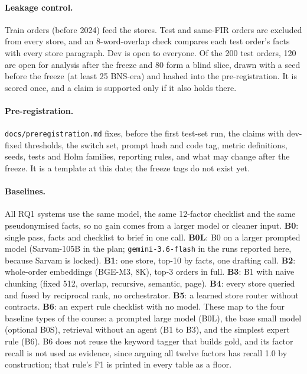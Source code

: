 \paragraph{Leakage control.} Train orders (before 2024) feed the stores. Test and same-FIR orders are excluded from every store, and an 8-word-overlap check compares each test order's facts with every store paragraph. Dev is open to everyone. Of the 200 test orders, 120 are open for analysis after the freeze and 80 form a blind slice, drawn with a seed before the freeze (at least 25 BNS-era) and hashed into the pre-registration. It is scored once, and a claim is supported only if it also holds there.

\paragraph{Pre-registration.} \texttt{docs/preregistration.md} fixes, before the first test-set run, the claims with dev-fixed thresholds, the switch set, prompt hash and code tag, metric definitions, seeds, tests and Holm families, reporting rules, and what may change after the freeze. It is a template at this date; the freeze tags do not exist yet.

\paragraph{Baselines.} All RQ1 systems use the same model, the same 12-factor checklist and the same pseudonymised facts, so no gain comes from a larger model or cleaner input. \textbf{B0}: single pass, facts and checklist to brief in one call. \textbf{B0L}: B0 on a larger prompted model (Sarvam-105B in the plan; \texttt{gemini-3.6-flash} in the runs reported here, because Sarvam is locked). \textbf{B1}: one store, top-10 by facts, one drafting call. \textbf{B2}: whole-order embeddings (BGE-M3, 8K), top-3 orders in full. \textbf{B3}: B1 with naive chunking (fixed 512, overlap, recursive, semantic, page). \textbf{B4}: every store queried and fused by reciprocal rank, no orchestrator. \textbf{B5}: a learned store router without contracts. \textbf{B6}: an expert rule checklist with no model. These map to the four baseline types of the course: a prompted large model (B0L), the base small model (optional B0S), retrieval without an agent (B1 to B3), and the simplest expert rule (B6). B6 does not reuse the keyword tagger that builds gold, and its factor recall is not used as evidence, since arguing all twelve factors has recall 1.0 by construction; that rule's F1 is printed in every table as a floor.

